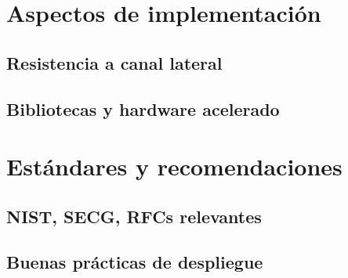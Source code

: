 \section{Aspectos de implementación}
\subsection{Resistencia a canal lateral}
\subsection{Bibliotecas y hardware acelerado}

\section{Estándares y recomendaciones}
\subsection{NIST, SECG, RFCs relevantes}
\subsection{Buenas prácticas de despliegue}